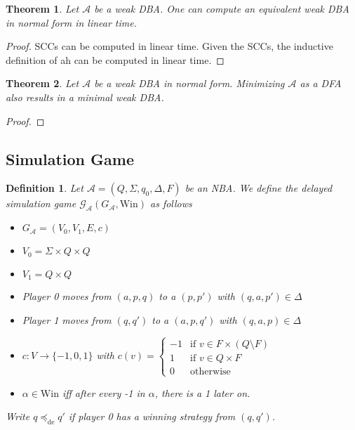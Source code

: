 \documentclass{article}
\newtheorem{theorem}{Theorem}[section]
\newtheorem{definition}{Definition}
\begin{document}
\begin{theorem}
	Let $\mathcal{A}$ be a weak DBA. One can compute an equivalent weak DBA in normal form in linear time.
\end{theorem}
\begin{proof}
	SCCs can be computed in linear time. Given the SCCs, the inductive definition of ah can be computed in linear time.
\end{proof}


\begin{theorem}
	Let $\mathcal{A}$ be a weak DBA in normal form. Minimizing $\mathcal{A}$ as a DFA also results in a minimal weak DBA.
\end{theorem}
\begin{proof}
\end{proof}



\subsection{Simulation Game}
\begin{definition}
	Let $\mathcal{A} = (Q, \Sigma, q_0, \Delta, F)$ be an NBA. We define the delayed simulation game $\mathcal{G}_\mathcal{A}(G_\mathcal{A}, \text{Win})$ as follows
	\begin{itemize}
		\item $G_\mathcal{A} = (V_0, V_1, E, c)$ 
		\item $V_0 = \Sigma \times Q \times Q$
		\item $V_1 = Q \times Q$
		\item Player 0 moves from $(a, p, q)$ to a $(p, p')$ with $(q, a, p') \in \Delta$
		\item Player 1 moves from $(q, q')$ to a $(a, p, q')$ with $(q, a, p) \in \Delta$
		\item $c : V \rightarrow \{-1, 0, 1\}$ with $c(v) = \begin{cases} -1 & \text{if } v \in F \times (Q \setminus F) \\ 1 & \text{if } v \in Q \times F \\ 0 & \text{otherwise} \end{cases}$
		\item $\alpha \in \text{Win}$ iff after every -1 in $\alpha$, there is a 1 later on.
	\end{itemize}
	
	Write $q \preceq_\text{de} q'$ if player 0 has a winning strategy from $(q, q')$.
\end{definition}
\end{document}
